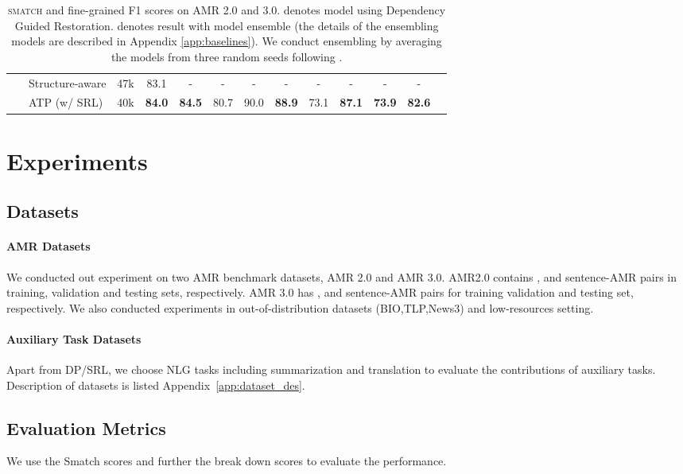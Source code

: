 \documentclass[11pt]{article}
\begin{document}
\begin{table*}[!t]
{\begin{tabular}{llccccccccccc}
        ~& Structure-aware \citep{saft} &47k &83.1&-&-&-&-&-&-&-&-\\
        
        ~& ATP (w/ SRL) &40k & \textbf{84.0}&\textbf{84.5}&80.7&90.0&\textbf{88.9}&73.1&\textbf{87.1}&\textbf{73.9}&\textbf{82.6} \\

        \bottomrule
    \end{tabular}
    } \caption{\textsc{smatch} and fine-grained F1 scores on AMR 2.0 and 3.0.  denotes model using Dependency Guided Restoration.  denotes result with model ensemble (the details of the ensembling models are described in Appendix \ref{app:baselines}). We conduct ensembling by averaging the models from three random seeds following \citet{saft}.}
    \label{tab:main_results2.0}
\end{table*}

 \section{Experiments}
\subsection{Datasets}
\paragraph{AMR Datasets} We conducted out experiment on two AMR benchmark datasets, AMR 2.0 and AMR 3.0. AMR2.0 contains ,  and  sentence-AMR pairs in training, validation and testing sets, respectively. AMR 3.0 has ,  and  sentence-AMR pairs for training validation and testing set, respectively. We also conducted experiments in out-of-distribution datasets (BIO,TLP,News3) and low-resources setting.

\paragraph{Auxiliary Task Datasets} Apart from DP/SRL, we choose NLG tasks including summarization and translation to evaluate the contributions of auxiliary tasks. Description of datasets is listed Appendix~\ref{app:dataset_des}.


\subsection{Evaluation Metrics}
We use the Smatch scores \citep{cai-smatch}  and further the break down scores \cite{dam-smatch-incremental} to evaluate the performance.
\end{document}

